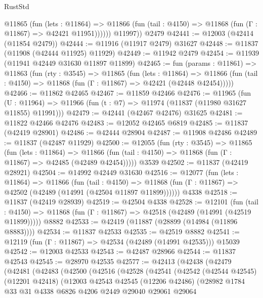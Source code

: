 \begin{lexlean}{RustStd}
\begin{coremodule}
{\begin{coremodule}
{{{{{{{{{{{{{{{{{{{{{{{{{{{{{{{{{{{{{{{{{{{{{{{{{{            @11865
              (fun (lets : @11864) =>
              @11866 (fun (tail : @4150) => @11868 (fun (Γ : @11867) => @42421 @11951))))))
        @11997))
    @2479
@42441 := @12003 (@42414 (@11854 @2479))
@42444 := @11916 (@11917 @2479) @31627
@42448 := @11837 (@11908 (@42444 @11925) @11929)
@42449 := @11942 @2479
@42454 := @11939 (@11941 @42449 @31630 @11897 @11899)
@42465 := fun (params : @11861) =>
  @11863
    (fun (rty : @3545) =>
    @11865
      (fun (lets : @11864) =>
      @11866 (fun (tail : @4150) => @11868 (fun (Γ : @11867) => @42421 (@42448 @42454)))))
@42466 := @11862 @42465
@42467 := @11859 @42466
@42476 := @11965
    (fun (U : @11964) => @11966 (fun (t : @7) => @11974 (@11837 (@11980 @31627 @11855) @11991)))
@42479 := @42441 (@42467 @42476) @31625
@42481 := @11822 @42466 @42476
@42483 := @12052 @42465 @6819
@42485 := @11837 (@42419 @28901)
@42486 := @42444 @28904
@42487 := @11908 @42486
@42489 := @11837 (@42487 @11929)
@42500 := @12055
    (fun (rty : @3545) =>
    @11865
      (fun (lets : @11864) =>
      @11866 (fun (tail : @4150) => @11868 (fun (Γ : @11867) => @42485 (@42489 @42454)))))
    @3539
@42502 := @11837 (@42419 @28921)
@42504 := @14992 @42449 @31630
@42516 := @12077
    (fun (lets : @11864) =>
    @11866
      (fun (tail : @4150) =>
      @11868 (fun (Γ : @11867) => @42502 (@42489 (@14991 (@42504 @11897 @11899))))))
    @4338
@42518 := @11837 (@42419 @28939)
@42519 := @42504 @4338
@42528 := @12101
    (fun (tail : @4150) => @11868 (fun (Γ : @11867) => @42518 (@42489 (@14991 (@42519 @11899)))))
    @8882
@42533 := @42419 (@11887 (@28899 (@14984 (@11896 @8883))))
@42534 := @11837 @42533
@42535 := @42519 @8882
@42541 := @12119 (fun (Γ : @11867) => @42534 (@42489 (@14991 @42535))) @15039
@42542 := @12003 @42533
@42543 := @42487 @28966
@42544 := @11837 @42543
@42545 := @28970 @42535
@42577 := @42413
    (@42438
      (@42479
        (@42481
          (@42483
            (@42500
              (@42516
                (@42528
                  (@42541
                    (@42542
                      (@42544 @42545)
                      (@12201 @42418)
                      (@12003
                        @42543
                        @42545
                        (@12206 @42486)
                        (@28982
                          @1784
                          @33
                          @31
                          @4338
                          @6826
                          @4206
                          @2449
                          @29040
                          @29061
                          @29064
}}}}}}}}}}}}}}}}}}}}}}}}}}}}}}}}}}}}}}}}}}}}}}}}}}
\end{coremodule}}
\end{coremodule}
\end{lexlean}
